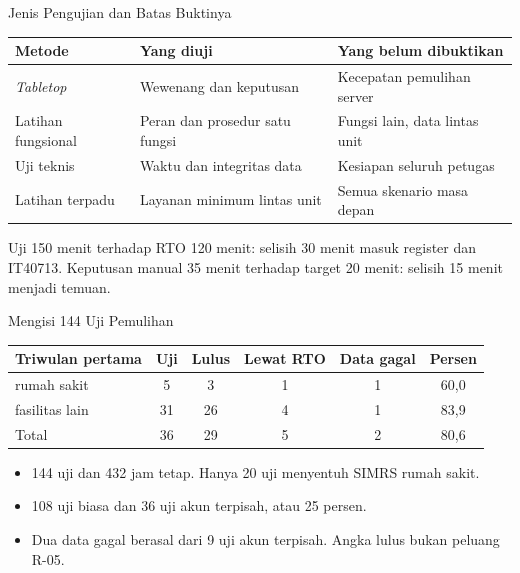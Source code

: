 \documentclass[aspectratio=169, table, 12pt]{beamer}
\begin{document}
\begin{frame}{{\Large Jenis Pengujian dan Batas Buktinya}}
  \vspace{4pt}
  \footnotesize
  \begin{tabularx}{\textwidth}{|>{\raggedright\arraybackslash}p{}|>{\raggedright\arraybackslash}X|>{\raggedright\arraybackslash}X|}
    \hline
    \textbf{Metode} & \textbf{Yang diuji} & \textbf{Yang belum dibuktikan} \\ \hline
    \textit{Tabletop} & Wewenang dan keputusan & Kecepatan pemulihan server \\ \hline
    Latihan fungsional & Peran dan prosedur satu fungsi & Fungsi lain, data lintas unit \\ \hline
    Uji teknis & Waktu dan integritas data & Kesiapan seluruh petugas \\ \hline
    Latihan terpadu & Layanan minimum lintas unit & Semua skenario masa depan \\ \hline
  \end{tabularx}

  \vspace{8pt}
  \small Uji 150 menit terhadap RTO 120 menit: selisih 30 menit masuk register dan IT40713.
  Keputusan manual 35 menit terhadap target 20 menit: selisih 15 menit menjadi temuan.
\end{frame}

\begin{frame}{{\Large Mengisi 144 Uji Pemulihan}}
  \vspace{2pt}
  \footnotesize
  \begin{tabularx}{\textwidth}{|>{\raggedright\arraybackslash}X|c|c|c|c|c|}
    \hline
    \textbf{Triwulan pertama} & \textbf{Uji} & \textbf{Lulus} & \textbf{Lewat RTO} & \textbf{Data
    gagal} & \textbf{Persen} \\ \hline
    5 rumah sakit & 5 & 3 & 1 & 1 & 60,0 \\ \hline
    31 fasilitas lain & 31 & 26 & 4 & 1 & 83,9 \\ \hline
    Total & 36 & 29 & 5 & 2 & 80,6 \\ \hline
  \end{tabularx}

  \vspace{6pt}
  \small
  \begin{itemize}
    \item 144 uji dan 432 jam tetap. Hanya 20 uji menyentuh SIMRS rumah sakit.
    \item 108 uji biasa dan 36 uji akun terpisah, atau 25 persen.
    \item Dua data gagal berasal dari 9 uji akun terpisah. Angka lulus bukan peluang R-05.
  \end{itemize}
\end{frame}
\end{document}
